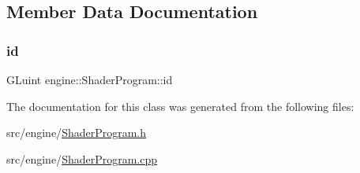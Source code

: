 \subsection{Member Data Documentation}
\mbox{\label{classengine_1_1_shader_program_a4114a65713b84771ce13f5eea1f1a19e}} 
\subsubsection{\texorpdfstring{id}{id}}
{\footnotesize\ttfamily G\+Luint engine\+::\+Shader\+Program\+::id\hspace{0.3cm}{\ttfamily [private]}}



The documentation for this class was generated from the following files\+:\begin{DoxyCompactItemize}
\item 
src/engine/\mbox{\hyperlink{_shader_program_8h}{Shader\+Program.\+h}}\item 
src/engine/\mbox{\hyperlink{_shader_program_8cpp}{Shader\+Program.\+cpp}}\end{DoxyCompactItemize}
